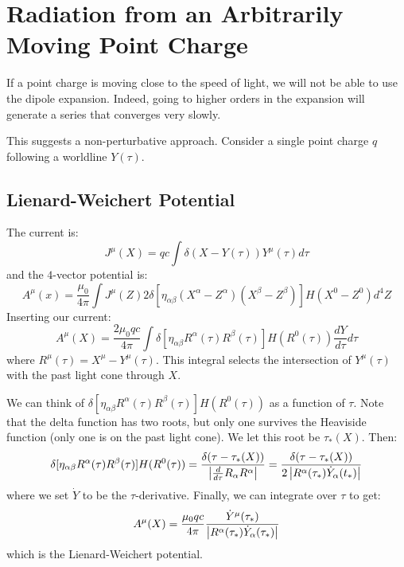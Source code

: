 \documentclass[../Main.tex]{subfiles}
\begin{document}
\section{Radiation from an Arbitrarily Moving Point Charge}
If a point charge is moving close to the speed of light, we will not be able to use the dipole expansion. Indeed, going to higher orders in the expansion will generate a series that converges very slowly.

This suggests a non-perturbative approach. Consider a single point charge $q$ following a worldline $Y(\tau)$.
\subsection{Lienard-Weichert Potential}
The current is:
\begin{equation*}
    J^\mu(X) = qc \int \delta(X - Y(\tau)) Y^\mu(\tau) d\tau
\end{equation*}
and the $4$-vector potential is:
\begin{equation*}
    A^\mu(x) = \frac{\mu_0}{4\pi} \int J^\mu(Z) 2\delta\left[\eta_{\alpha\beta}(X^\alpha - Z^\alpha)(X^\beta - Z^\beta)\right] H(X^0 - Z^0) d^4Z
\end{equation*}
Inserting our current:
\begin{equation*}
    A^\mu(X) = \frac{2\mu_0qc}{4\pi} \int \delta[\eta_{\alpha\beta}R^\alpha(\tau)R^\beta(\tau)] H(R^0(\tau)) \frac{dY}{d\tau} d\tau
\end{equation*}
where $R^\mu(\tau) = X^\mu - Y^\mu(\tau)$. This integral selects the intersection of $Y^\mu(\tau)$ with the past light cone through $X$.

We can think of $\delta[\eta_{\alpha\beta}R^\alpha(\tau) R^\beta(\tau)] H(R^0(\tau))$ as a function of $\tau$. Note that the delta function has two roots, but only one survives the Heaviside function (only one is on the past light cone). We let this root be $\tau_*(X)$. Then:
\begin{equation*}
    \delta[\eta_{\alpha\beta}R^\alpha(\tau) R^\beta(\tau)] H(R^0(\tau)) = \frac{\delta(\tau - \tau_*(X))}{\left|\frac{d}{d\tau} R_\alpha R^\alpha\right|} = \frac{\delta(\tau - \tau_*(X))}{2\left|R^\alpha(\tau_*) \dot{Y}_\alpha(t_*)\right|}
\end{equation*}
where we set $\dot{Y}$ to be the $\tau$-derivative. Finally, we can integrate over $\tau$ to get:
\begin{equation}
    A^\mu(X) = \frac{\mu_0 q c}{4\pi} \frac{\dot{Y}^\mu(\tau_*)}{\left|R^\alpha(\tau_*) \dot{Y}_\alpha(\tau_*)\right|}
    \label{eqnLienardWeichert}
\end{equation}
which is the Lienard-Weichert potential.
\end{document}
